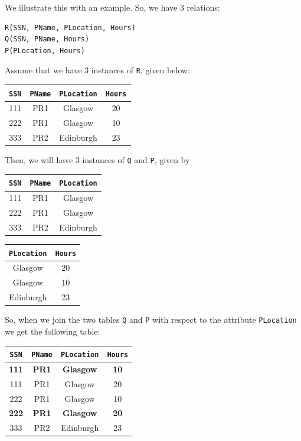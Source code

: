 \documentclass[a4paper, openany]{memoir}
\begin{document}
We illustrate this with an example. So, we have 3 relations:
\begin{Verbatim}[commandchars=+\[\]]
R(SSN, PName, PLocation, Hours)
Q(SSN, PName, Hours)
P(PLocation, Hours)
\end{Verbatim}
Assume that we have 3 instances of \texttt{R}, given below:
\begin{table}[H]
    \centering
    \begin{tabular}{|c|c|c|c|}
        \hline
        \texttt{SSN} & \texttt{PName} & \texttt{PLocation} & \texttt{Hours} \\
        \hline
        111 & PR1 & Glasgow & 20 \\
        222 & PR1 & Glasgow & 10 \\
        333 & PR2 & Edinburgh & 23 \\
        \hline
    \end{tabular}
\end{table}
\noindent Then, we will have 3 instances of \texttt{Q} and \texttt{P}, given by
\begin{table}[H]
    \centering
    \begin{tabular}{|c|c|c|}
        \hline
        \texttt{SSN} & \texttt{PName} & \texttt{PLocation} \\
        \hline
        111 & PR1 & Glasgow \\
        222 & PR1 & Glasgow \\
        333 & PR2 & Edinburgh \\
        \hline
    \end{tabular}
\end{table}
\begin{table}[H]
    \centering
    \begin{tabular}{|c|c|}
        \hline
        \texttt{PLocation} & \texttt{Hours} \\
        \hline
        Glasgow & 20 \\
        Glasgow & 10 \\
        Edinburgh & 23 \\
        \hline
    \end{tabular}
\end{table}
\noindent So, when we join the two tables \texttt{Q} and \texttt{P} with respect to the attribute \texttt{PLocation} we get the following table:
\begin{table}[H]
    \centering
    \begin{tabular}{|c|c|c|c|}
        \hline
        \texttt{SSN} & \texttt{PName} & \texttt{PLocation} & \texttt{Hours} \\
        \hline
        \textbf{111} & \textbf{PR1} & \textbf{Glasgow} & \textbf{10} \\
        111 & PR1 & Glasgow & 20 \\
        222 & PR1 & Glasgow & 10 \\
        \textbf{222} & \textbf{PR1} & \textbf{Glasgow} & \textbf{20} \\
        333 & PR2 & Edinburgh & 23 \\
        \hline
    \end{tabular}
\end{table}
\end{document}
